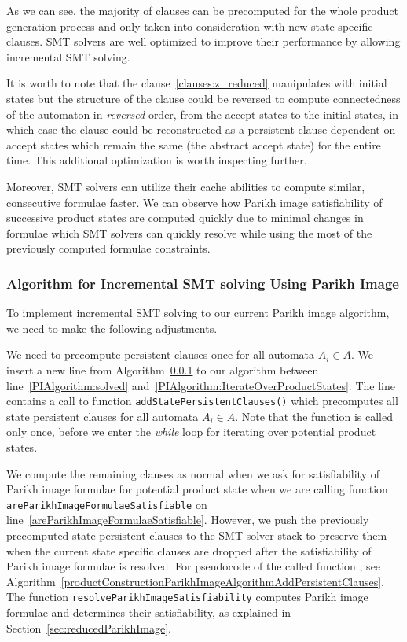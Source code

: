 As we can see, the majority of clauses can be precomputed for the whole product generation process and only taken into consideration with new state specific clauses. SMT solvers are well optimized to improve their performance by allowing incremental SMT solving.

It is worth to note that the clause~\ref{clauses:z_reduced} manipulates with initial states but the structure of the clause could be reversed to compute connectedness of the automaton in \emph{reversed} order, from the accept states to the initial states, in which case the clause could be reconstructed as a persistent clause dependent on accept states which remain the same (the abstract accept state) for the entire time. This additional optimization is worth inspecting further.

Moreover, SMT solvers can utilize their cache abilities to compute similar, consecutive formulae faster. We can observe how Parikh image satisfiability of successive product states are computed quickly due to minimal changes in formulae which SMT solvers can quickly resolve while using the most of the previously computed formulae constraints.

\subsubsection{Algorithm for Incremental SMT solving Using Parikh Image}

To implement incremental SMT solving to our current Parikh image algorithm, we need to make the following adjustments.

We need to precompute persistent clauses once for all automata $A_i \in A$. We insert a new line from Algorithm~\ref{} to our algorithm between line~\ref{PIAlgorithm:solved} and~\ref{PIAlgorithm:IterateOverProductStates}. The line contains a call to function \texttt{addStatePersistentClauses()} which precomputes all state persistent clauses for all automata $A_i \in A$. Note that the function is called only once, before we enter the \emph{while} loop for iterating over potential product states.

We compute the remaining clauses as normal when we ask for satisfiability of Parikh image formulae for potential product state when we are calling function \texttt{areParikhImageFormulaeSatisfiable} on line~\ref{areParikhImageFormulaeSatisfiable}. However, we push the previously precomputed state persistent clauses to the SMT solver stack to preserve them when the current state specific clauses are dropped after the satisfiability of Parikh image formulae is resolved. For pseudocode of the called function , see Algorithm~\ref{productConstructionParikhImageAlgorithmAddPersistentClauses}. The function \texttt{resolveParikhImageSatisfiability} computes Parikh image formulae and determines their satisfiability, as explained in Section~\ref{sec:reducedParikhImage}.

